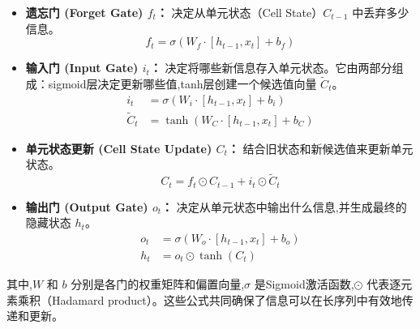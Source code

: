 \begin{itemize}
    \item \textbf{遗忘门 (Forget Gate) $f_t$：} 决定从单元状态（Cell State）$C_{t-1}$ 中丢弃多少信息。
    \[ f_t = \sigma(W_f \cdot [h_{t-1}, x_t] + b_f) \]
    \item \textbf{输入门 (Input Gate) $i_t$：} 决定将哪些新信息存入单元状态。它由两部分组成：sigmoid层决定更新哪些值,tanh层创建一个候选值向量 $\tilde{C}_t$。
    \begin{align*}
        i_t &= \sigma(W_i \cdot [h_{t-1}, x_t] + b_i) \\
        \tilde{C}_t &= \tanh(W_C \cdot [h_{t-1}, x_t] + b_C)
    \end{align*}
    \item \textbf{单元状态更新 (Cell State Update) $C_t$：} 结合旧状态和新候选值来更新单元状态。
    \[ C_t = f_t \odot C_{t-1} + i_t \odot \tilde{C}_t \]
    \item \textbf{输出门 (Output Gate) $o_t$：} 决定从单元状态中输出什么信息,并生成最终的隐藏状态 $h_t$。
    \begin{align*}
        o_t &= \sigma(W_o \cdot [h_{t-1}, x_t] + b_o) \\
        h_t &= o_t \odot \tanh(C_t)
    \end{align*}
\end{itemize}
其中,$W$ 和 $b$ 分别是各门的权重矩阵和偏置向量,$\sigma$ 是Sigmoid激活函数,$\odot$ 代表逐元素乘积（Hadamard product）。这些公式共同确保了信息可以在长序列中有效地传递和更新。

